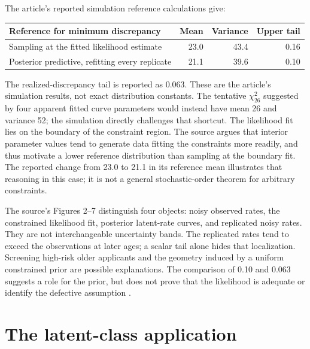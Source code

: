 The article's reported simulation reference calculations give:
\begin{center}\small
\begin{tabular}{lrrr}
\hline
Reference for minimum discrepancy & Mean & Variance & Upper tail\\\hline
Sampling at the fitted likelihood estimate &23.0&43.4&0.16\\
Posterior predictive, refitting every replicate&21.1&39.6&0.10\\\hline
\end{tabular}
\end{center}
The realized-discrepancy tail is reported as 0.063. These are the article's
simulation results, not exact distribution constants. The tentative
\(\chi^2_{26}\) suggested by four apparent fitted curve parameters would
instead have mean 26 and variance 52; the simulation directly challenges
that shortcut.
The likelihood fit lies on the boundary of the constraint region. The
source argues that interior parameter values tend to generate data fitting
the constraints more readily, and thus motivate a lower reference
distribution than sampling at the boundary fit. The reported change from
23.0 to 21.1 in its reference mean illustrates that reasoning in this case;
it is not a general stochastic-order theorem for arbitrary constraints.

The source's Figures 2--7 distinguish four objects: noisy observed rates,
the constrained likelihood fit, posterior latent-rate curves, and replicated
noisy rates. They are not interchangeable uncertainty bands. The replicated
rates tend to exceed the observations at later ages; a scalar tail alone
hides that localization. Screening high-risk older applicants and the
geometry induced by a uniform constrained prior are possible explanations.
The comparison of 0.10 and 0.063 suggests a role for the prior, but does
not prove that the likelihood is adequate or identify the defective assumption
\cite[secs.~3.1--3.2]{GelmanMengStern1996Main}.

\section{The latent-class application}
\label{sec:p15-ppc-latent-classes}

